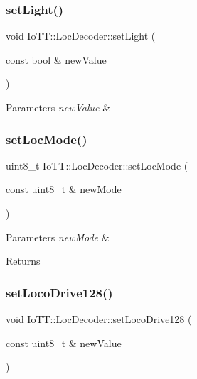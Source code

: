 \subsubsection{\texorpdfstring{set\+Light()}{setLight()}}
{\footnotesize\ttfamily void Io\+T\+T\+::\+Loc\+Decoder\+::set\+Light (\begin{DoxyParamCaption}\item[{const bool \&}]{new\+Value }\end{DoxyParamCaption})}


\begin{DoxyParams}{Parameters}
{\em new\+Value} & \\
\hline
\end{DoxyParams}
\mbox{\label{classIoTT_1_1LocDecoder_a7ed0dd387ddae6c5634cde59e3fc7966}} 
\subsubsection{\texorpdfstring{set\+Loc\+Mode()}{setLocMode()}}
{\footnotesize\ttfamily uint8\+\_\+t Io\+T\+T\+::\+Loc\+Decoder\+::set\+Loc\+Mode (\begin{DoxyParamCaption}\item[{const uint8\+\_\+t \&}]{new\+Mode }\end{DoxyParamCaption})}


\begin{DoxyParams}{Parameters}
{\em new\+Mode} & \\
\hline
\end{DoxyParams}
\begin{DoxyReturn}{Returns}

\end{DoxyReturn}
\mbox{\label{classIoTT_1_1LocDecoder_af308320a9ae794af3cd1f20b46a7d639}} 
\subsubsection{\texorpdfstring{set\+Loco\+Drive128()}{setLocoDrive128()}}
{\footnotesize\ttfamily void Io\+T\+T\+::\+Loc\+Decoder\+::set\+Loco\+Drive128 (\begin{DoxyParamCaption}\item[{const uint8\+\_\+t \&}]{new\+Value }\end{DoxyParamCaption})}


